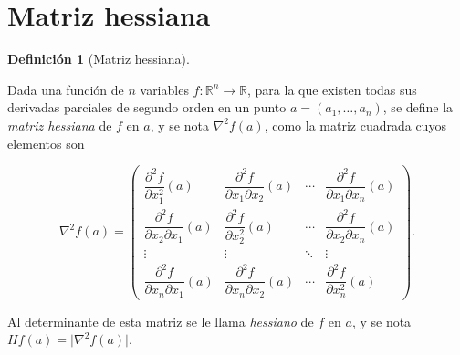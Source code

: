 \documentclass[
  a4paper,
]{scrreport}
\theoremstyle{plain}
\theoremstyle{plain}
\theoremstyle{definition}
\newtheorem{definition}{Definición}[chapter]
\theoremstyle{definition}
\theoremstyle{plain}
\theoremstyle{definition}
\theoremstyle{remark}
\begin{document}
\hypertarget{matriz-hessiana}{%
\section{Matriz hessiana}\label{matriz-hessiana}}

\begin{definition}[Matriz
hessiana]\protect\hypertarget{def-matriz-hessiana}{}\label{def-matriz-hessiana}

Dada una función de \(n\) variables
\(f:\mathbb{R}^n\rightarrow \mathbb{R}\), para la que existen todas sus
derivadas parciales de segundo orden en un punto \(a=(a_1,\ldots,a_n)\),
se define la \emph{matriz hessiana} de \(f\) en \(a\), y se nota
\(\nabla^2f(a)\), como la matriz cuadrada cuyos elementos son

\[\nabla^2f(a)=\left(
\begin{array}{cccc}
\dfrac{\partial^2 f}{\partial x_1^2}(a) &
\dfrac{\partial^2 f}{\partial x_1 \partial x_2}(a) &
\cdots &
\dfrac{\partial^2 f}{\partial x_1 \partial x_n}(a)\\
\dfrac{\partial^2 f}{\partial x_2 \partial x_1}(a) &
\dfrac{\partial^2 f}{\partial x_2^2}(a) &
\cdots &
\dfrac{\partial^2 f}{\partial x_2 \partial x_n}(a)\\
\vdots & \vdots & \ddots & \vdots \\
\dfrac{\partial^2 f}{\partial x_n \partial x_1}(a) &
\dfrac{\partial^2 f}{\partial x_n \partial x_2}(a) &
\cdots &
\dfrac{\partial^2 f}{\partial x_n^2}(a)
\end{array}
\right).\]

Al determinante de esta matriz se le llama \emph{hessiano} de \(f\) en
\(a\), y se nota \(Hf(a)=\lvert \nabla^2f(a)\rvert\).

\end{definition}
\end{document}
